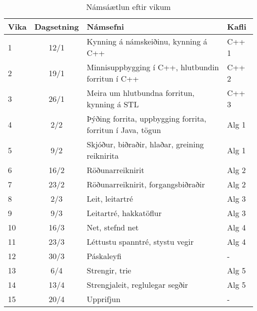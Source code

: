 \documentclass{article}
\begin{document}
\begin{table}
	\caption{Námsáætlun eftir vikum}
	\label{tab:schedule}
	\begin{center}
		\renewcommand{\arraystretch}{1.2}
		\begin{tabularx}{\linewidth}{lcXp{1cm}}
			\toprule
			Vika & Dagsetning & Námsefni                                                   & Kafli \\
			\midrule
			1    & 12/1       & Kynning á námskeiðinu, kynning á C++                       & C++ 1 \\
			2    & 19/1       & Minnisuppbygging í C++, hlutbundin forritun í C++          & C++ 2 \\
			3    & 26/1       & Meira um hlutbundna forritun, kynning á STL                & C++ 3 \\
			4    & 2/2        & Þýðing forrita, uppbygging forrita, forritun í Java, tögun & Alg 1 \\
			5    & 9/2        & Skjóður, biðraðir, hlaðar, greining reiknirita             & Alg 1 \\
			6    & 16/2       & Röðunarreiknirit                                           & Alg 2 \\
			7    & 23/2       & Röðunarreiknirit, forgangsbiðraðir                         & Alg 2 \\
			8    & 2/3        & Leit, leitartré                                            & Alg 3 \\
			9    & 9/3        & Leitartré, hakkatöflur                                     & Alg 3 \\
			10   & 16/3       & Net, stefnd net                                            & Alg 4 \\
			11   & 23/3       & Léttustu spanntré, stystu vegir                            & Alg 4 \\
			12   & 30/3       & Páskaleyfi                                                 & -     \\
			13   & 6/4        & Strengir, trie                                             & Alg 5 \\
			14   & 13/4       & Strengjaleit, reglulegar segðir                            & Alg 5 \\
			15   & 20/4       & Upprifjun                                                  & -     \\
			\bottomrule
		\end{tabularx}
	\end{center}
\end{table}
\end{document}
